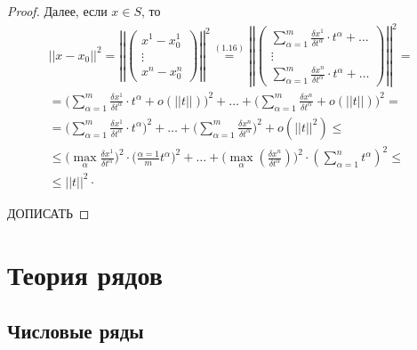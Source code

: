 \documentclass{report}
\theoremstyle{definition}
\begin{document}
\begin{proof}
  Далее, если $x\in S$, то
  \begin{multline*}
    ||x-x_0||^2 = \left|\left|\left(\begin{array}{c}
        x^1 - x_0^1 \\
        \vdots      \\
        x^n - x^n_0
      \end{array}\right)\right|\right|^2 \overset{(1.16)}{=} \left|\left|\left(\begin{array}{c}
        \sum_{\alpha=1}^{m}\frac{\delta x^1}{\delta t^\alpha}\cdot t^\alpha + \ldots \\
        \vdots                                                                       \\
        \sum_{\alpha=1}^{m}\frac{\delta x^n}{\delta t^\alpha}\cdot t^\alpha + \ldots
      \end{array}\right)\right|\right|^2 = \\
    = \bigg(\sum_{\alpha = 1}^{m}\frac{\delta x^1}{\delta t^\alpha}\cdot t^\alpha + o(||t||)\bigg)^2 + \ldots + \bigg(\sum_{\alpha=1}^{m}\frac{\delta x^n}{\delta t^\alpha} + o(||t||)\bigg)^2 =\\
    = \bigg(\sum_{\alpha = 1}^{m}\frac{\delta x^1}{\delta t^\alpha}\cdot t^\alpha \bigg)^2 + \ldots + \bigg(\sum_{\alpha=1}^{m}\frac{\delta x^n}{\delta t^\alpha} \bigg)^2 + o(||t||^2) \leqslant \\
    \leqslant \bigg( \underset{\alpha}{\max}\frac{\delta x^1}{\delta t^\alpha}\bigg)^2 \cdot \bigg( \frac{\alpha=1}{m}t^\alpha\bigg)^2 + \ldots + \bigg(\underset{\alpha}{\max}(\frac{\delta x^n}{\delta t^\alpha}) \bigg)^2\cdot(\sum_{\alpha=1}^{n}t^\alpha)^2 \leqslant \\
    \leqslant ||t||^2 \cdot
  \end{multline*}

  ДОПИСАТЬ
\end{proof}

\chapter{Теория рядов}

\section{Числовые ряды}
\end{document}
